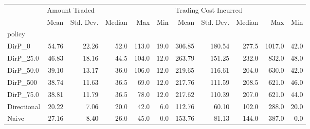 \begin{tabular}{lrrrrrrrrrr}
\toprule
{} & \multicolumn{5}{l}{Amount Traded} & \multicolumn{5}{l}{Trading Cost Incurred} \\
{} &          Mean & Std. Dev. & Median &    Max &   Min &                  Mean & Std. Dev. & Median &     Max &   Min \\
policy      &               &           &        &        &       &                       &           &        &         &       \\
\midrule
DirP\_0      &         54.76 &     22.26 &   52.0 &  113.0 &  19.0 &                306.85 &    180.54 &  277.5 &  1017.0 &  42.0 \\
DirP\_25.0   &         46.83 &     18.16 &   44.5 &  104.0 &  12.0 &                263.79 &    151.25 &  232.0 &   832.0 &  48.0 \\
DirP\_50.0   &         39.10 &     13.17 &   36.0 &  106.0 &  12.0 &                219.65 &    116.61 &  204.0 &   630.0 &  42.0 \\
DirP\_500    &         38.74 &     11.63 &   36.5 &   69.0 &  12.0 &                217.76 &    111.59 &  208.5 &   621.0 &  46.0 \\
DirP\_75.0   &         38.81 &     11.79 &   36.5 &   78.0 &  12.0 &                217.62 &    110.39 &  207.0 &   621.0 &  44.0 \\
Directional &         20.22 &      7.06 &   20.0 &   42.0 &   6.0 &                112.76 &     60.10 &  102.0 &   288.0 &  20.0 \\
Naive       &         27.16 &      8.40 &   26.0 &   45.0 &   0.0 &                153.76 &     81.13 &  144.0 &   387.0 &   0.0 \\
\bottomrule
\end{tabular}
